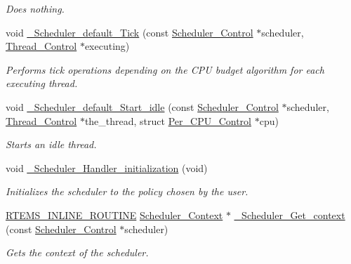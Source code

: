\begin{DoxyCompactItemize}
\begin{DoxyCompactList}\small\item\em Does nothing. \end{DoxyCompactList}\item 
void \mbox{\hyperlink{group__RTEMSScoreScheduler_ga389960397abd4e1c788c887884947f2b}{\+\_\+\+Scheduler\+\_\+default\+\_\+\+Tick}} (const \mbox{\hyperlink{struct__Scheduler__Control}{Scheduler\+\_\+\+Control}} $\ast$scheduler, \mbox{\hyperlink{struct__Thread__Control}{Thread\+\_\+\+Control}} $\ast$executing)
\begin{DoxyCompactList}\small\item\em Performs tick operations depending on the C\+PU budget algorithm for each executing thread. \end{DoxyCompactList}\item 
void \mbox{\hyperlink{group__RTEMSScoreScheduler_gafca781d2003ce33abe651436e5910dcb}{\+\_\+\+Scheduler\+\_\+default\+\_\+\+Start\+\_\+idle}} (const \mbox{\hyperlink{struct__Scheduler__Control}{Scheduler\+\_\+\+Control}} $\ast$scheduler, \mbox{\hyperlink{struct__Thread__Control}{Thread\+\_\+\+Control}} $\ast$the\+\_\+thread, struct \mbox{\hyperlink{structPer__CPU__Control}{Per\+\_\+\+C\+P\+U\+\_\+\+Control}} $\ast$cpu)
\begin{DoxyCompactList}\small\item\em Starts an idle thread. \end{DoxyCompactList}\item 
void \mbox{\hyperlink{group__RTEMSScoreScheduler_ga17385f03f24b3fe3ead98e17b612ef32}{\+\_\+\+Scheduler\+\_\+\+Handler\+\_\+initialization}} (void)
\begin{DoxyCompactList}\small\item\em Initializes the scheduler to the policy chosen by the user. \end{DoxyCompactList}\item 
\mbox{\hyperlink{group__RTEMSScoreBaseDefs_gac216239df231d5dbd15e3520b0b9313f}{R\+T\+E\+M\+S\+\_\+\+I\+N\+L\+I\+N\+E\+\_\+\+R\+O\+U\+T\+I\+NE}} \mbox{\hyperlink{structScheduler__Context}{Scheduler\+\_\+\+Context}} $\ast$ \mbox{\hyperlink{group__RTEMSScoreScheduler_ga9c62ef5a388b998fa041a269297be1fe}{\+\_\+\+Scheduler\+\_\+\+Get\+\_\+context}} (const \mbox{\hyperlink{struct__Scheduler__Control}{Scheduler\+\_\+\+Control}} $\ast$scheduler)
\begin{DoxyCompactList}\small\item\em Gets the context of the scheduler. \end{DoxyCompactList}\item 

\end{DoxyCompactItemize}
